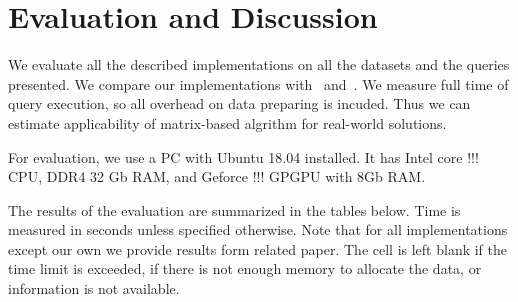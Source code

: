 \section{Evaluation and Discussion}

We evaluate all the described implementations on all the datasets and the queries presented.
We compare our implementations with~\cite{Mishin:2019:ECP:3327964.3328503} and~\cite{Kuijpers:2019:ESC:3335783.3335791}.
We measure full time of query execution, so all overhead on data preparing is incuded.
Thus we can estimate applicability of matrix-based algrithm for real-world solutions.

For evaluation, we use a PC with Ubuntu 18.04 installed.
It has Intel core !!! CPU, DDR4 32 Gb RAM, and Geforce !!! GPGPU with 8Gb RAM.

The results of the evaluation are summarized in the tables below.
Time is measured in seconds unless specified otherwise.
Note that for all implementations except our own we provide results form related paper.
The cell is left blank if the time limit is exceeded, if there is not enough memory to allocate the data, or information is not available.

